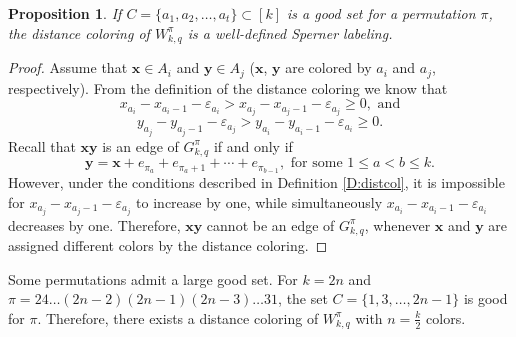 \documentclass{birkjour}
\newtheorem{prop}[thm]{Proposition}
\theoremstyle{definition}
\theoremstyle{remark}
\numberwithin{equation}{section}
\begin{document}
\begin{prop}\label{P:whendistanceisgood} If $C=\{a_1,a_2,
\ldots,a_{t}\}\subset [k]$ is a good set for a permutation $\pi$,
the distance coloring of $W^\pi_{k,q}$ is a well-defined Sperner
labeling.
\end{prop}
\begin{proof}
Assume that $\mathbf{x}\in A_i$ and $\mathbf{y}\in A_j$
($\mathbf{x}$, $\mathbf{y}$ are colored by $a_i$ and $a_j$,
respectively). From the definition of the distance coloring we
know that
$$x_{a_i}-x_{a_i-1}-\varepsilon_{a_i}>
x_{a_j}-x_{a_j-1}-\varepsilon_{a_j}\geq 0,\textrm{ and}$$$$
y_{a_j}-y_{a_j-1}-\varepsilon_{a_j}>
y_{a_i}-y_{a_i-1}-\varepsilon_{a_i}\geq 0.$$ Recall that
$\mathbf{xy}$ is an edge of $G^\pi_{k,q}$ if and only if
$$\mathbf{y}=\mathbf{x}+e_{\pi_a}+
e_{\pi_{a}+1}+\cdots+e_{\pi_{b-1}}, \textrm{ for some }1\leq a<b
\leq k.$$ However, under the conditions described in Definition
\ref{D:distcol}, it is impossible for
$x_{a_j}-x_{a_j-1}-\varepsilon_{a_j}$ to increase by one, while
simultaneously $x_{a_i}-x_{a_i-1}-\varepsilon_{a_i}$ decreases by
one. Therefore, $\mathbf{x}\mathbf{y}$ cannot be an edge of
$G^\pi_{k,q}$, whenever $\mathbf{x}$ and $\mathbf{y}$ are assigned
different colors by the distance coloring.
\end{proof}

Some permutations admit a large good set. For
$k=2n$ and $\pi=24\ldots(2n-2)(2n-1)(2n-3)\ldots 3 1$, the set
$C=\{1,3,\ldots,2n-1\}$ is good for $\pi$. Therefore, there exists
a distance coloring of $W^\pi_{k,q}$ with $n=\frac k 2$ colors.
\end{document}
